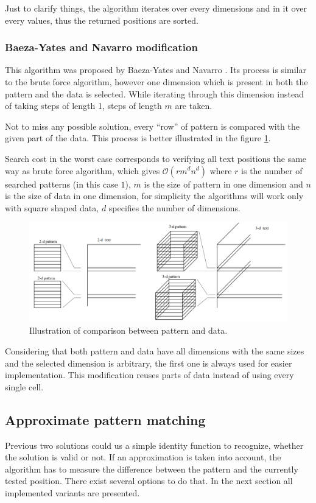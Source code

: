 Just to clarify things, the algorithm iterates over every dimensions and in it over every values, thus the returned positions are sorted.

\subsubsection{Baeza-Yates and Navarro modification}
This algorithm was proposed by Baeza-Yates and Navarro \cite{mdApproxPM}. Its process is similar to the brute force algorithm, however one dimension which is present in both the pattern and the data is selected. While iterating through this dimension instead of taking steps of length 1, steps of length $m$ are taken.

Not to miss any possible solution, every ``row'' of pattern is compared with the given part of the data. This process is better illustrated in the figure \ref{fig_skipDim}.

Search cost in the worst case corresponds to verifying all text positions the same way as brute force algorithm, which gives $ \mathcal{O} (rm^dn^d)$ where $r$ is the number of searched patterns (in this case $1$), $m$ is the size of pattern in one dimension and $n$ is the size of data in one dimension, for simplicity the algorithms will work only with square shaped data, $d$ specifies the number of dimensions. \cite{mdApproxPM}

\begin{figure}
\centering
\includegraphics[width=\textwidth]{skipDim}
\caption{Illustration of comparison between pattern and data. \cite{mdApproxPM}}
\label{fig_skipDim}
\end{figure}

Considering that both pattern and data have all dimensions with the same sizes and the selected dimension is arbitrary, the first one is always used for easier implementation. This modification reuses parts of data instead of using every single cell.

\subsection{Approximate pattern matching} \label{apm}
Previous two solutions could us a simple identity function to recognize, whether the solution is valid or not. If an approximation is taken into account, the algorithm has to measure the difference between the pattern and the currently tested position. There exist several options to do that. In the next section all implemented variants are presented.

